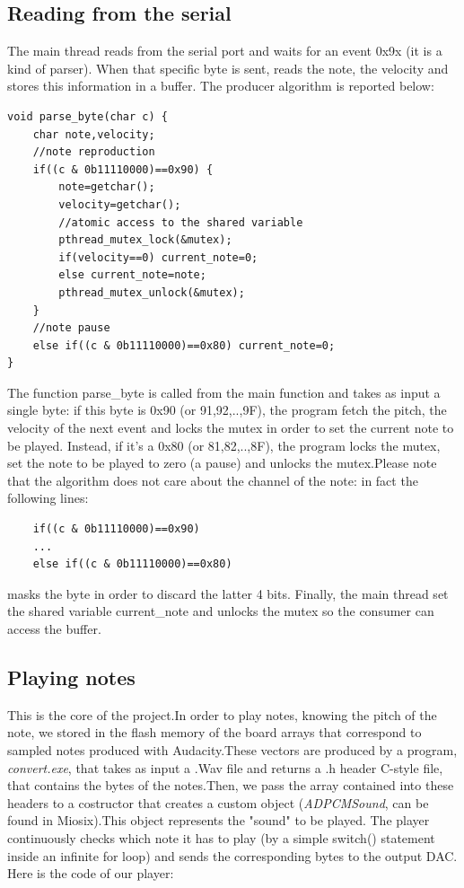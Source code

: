 \documentclass[12pt]{article}
\begin{document}
\subsection{Reading from the serial}
The main thread reads from the serial port and waits for an event 0x9x (it is a kind of parser). When that specific byte is sent, reads the note, the velocity and stores this information in a buffer. The producer algorithm is reported below:
\begin{lstlisting}
void parse_byte(char c) {
	char note,velocity;
	//note reproduction
	if((c & 0b11110000)==0x90) {
		note=getchar();
		velocity=getchar();
		//atomic access to the shared variable
		pthread_mutex_lock(&mutex);
		if(velocity==0) current_note=0;
		else current_note=note;
		pthread_mutex_unlock(&mutex);
	}
	//note pause
	else if((c & 0b11110000)==0x80) current_note=0;
}
\end{lstlisting}
The function parse\_byte is called from the main function and takes as input a single byte: if this byte is 0x90 (or 91,92,..,9F), the program fetch the pitch, the velocity of the next event and locks the mutex in order to set the current note to be played. Instead, if it's a 0x80 (or 81,82,..,8F), the program locks the mutex, set the note to be played to zero (a pause) and unlocks the mutex.Please note that the algorithm does not care about the channel of the note: in fact the following lines:
\begin{lstlisting}
	if((c & 0b11110000)==0x90)
	...
	else if((c & 0b11110000)==0x80)
\end{lstlisting}
masks the byte in order to discard the latter 4 bits.\newline
Finally, the main thread set the shared variable current\_note and unlocks the mutex so the consumer can access the buffer.

\subsection{Playing notes}
This is the core of the project.In order to play notes, knowing the pitch of the note, we stored in the flash memory of the board arrays that correspond to sampled notes produced with Audacity.These vectors are produced by a program, \textit{convert.exe}, that takes as input a .Wav file and returns a .h header C-style file, that contains the bytes of the notes.Then, we pass the array contained into these headers to a costructor that creates a custom object (\textit{ADPCMSound}, can be found in Miosix).This object represents the "sound" to be played.\newline
The player continuously checks which note it has to play (by a simple switch() statement inside an infinite for loop) and sends the corresponding bytes to the output DAC. Here is the code of our player:\newpage
\end{document}
